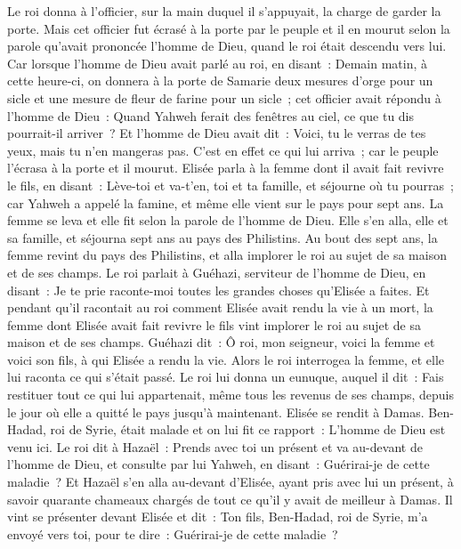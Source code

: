 \begin{multicols}{2}
Le roi donna à l'officier, sur la main duquel il s'appuyait, la charge de garder la porte. Mais cet officier fut écrasé à la porte par le peuple et il en mourut selon la parole qu'avait prononcée l'homme de Dieu, quand le roi était descendu vers lui.
Car lorsque l'homme de Dieu avait parlé au roi, en disant~: Demain matin, à cette heure-ci, on donnera à la porte de Samarie deux mesures d'orge pour un sicle et une mesure de fleur de farine pour un sicle~;
cet officier avait répondu à l'homme de Dieu~: Quand Yahweh ferait des fenêtres au ciel, ce que tu dis pourrait-il arriver~? Et l'homme de Dieu avait dit~: Voici, tu le verras de tes yeux, mais tu n'en mangeras pas.
C'est en effet ce qui lui arriva~; car le peuple l'écrasa à la porte et il mourut.
\VerseOne{}Elisée parla à la femme dont il avait fait revivre le fils, en disant~: Lève-toi et va-t'en, toi et ta famille, et séjourne où tu pourras~; car Yahweh a appelé la famine, et même elle vient sur le pays pour sept ans.
La femme se leva et elle fit selon la parole de l'homme de Dieu. Elle s'en alla, elle et sa famille, et séjourna sept ans au pays des Philistins.
Au bout des sept ans, la femme revint du pays des Philistins, et alla implorer le roi au sujet de sa maison et de ses champs.
Le roi parlait à Guéhazi, serviteur de l'homme de Dieu, en disant~: Je te prie raconte-moi toutes les grandes choses qu'Elisée a faites.
Et pendant qu'il racontait au roi comment Elisée avait rendu la vie à un mort, la femme dont Elisée avait fait revivre le fils vint implorer le roi au sujet de sa maison et de ses champs. Guéhazi dit~: Ô roi, mon seigneur, voici la femme et voici son fils, à qui Elisée a rendu la vie.
Alors le roi interrogea la femme, et elle lui raconta ce qui s'était passé. Le roi lui donna un eunuque, auquel il dit~: Fais restituer tout ce qui lui appartenait, même tous les revenus de ses champs, depuis le jour où elle a quitté le pays jusqu'à maintenant.
Elisée se rendit à Damas. Ben-Hadad, roi de Syrie, était malade et on lui fit ce rapport~: L'homme de Dieu est venu ici.
Le roi dit à Hazaël~: Prends avec toi un présent et va au-devant de l'homme de Dieu, et consulte par lui Yahweh, en disant~: Guérirai-je de cette maladie~?
Et Hazaël s'en alla au-devant d'Elisée, ayant pris avec lui un présent, à savoir quarante chameaux chargés de tout ce qu'il y avait de meilleur à Damas. Il vint se présenter devant Elisée et dit~: Ton fils, Ben-Hadad, roi de Syrie, m'a envoyé vers toi, pour te dire~: Guérirai-je de cette maladie~?

\end{multicols}
